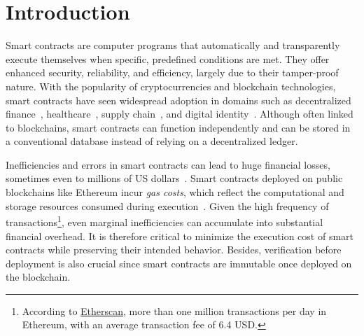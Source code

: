 \section{Introduction}

Smart contracts are computer programs that automatically and transparently execute themselves when specific, predefined conditions are met.
They offer enhanced security, reliability, and efficiency, largely due to their tamper-proof nature.
With the popularity of cryptocurrencies and blockchain technologies, smart contracts have seen widespread adoption in domains such as decentralized finance~\cite{schar2021decentralized}, healthcare~\cite{khatoon2020blockchain}, supply chain~\cite{queiroz2020blockchain}, and digital identity~\cite{takemiya2018sora}. Although often linked to blockchains, smart contracts can function independently and can be stored in a conventional database instead of relying on a decentralized ledger.

Inefficiencies and errors in smart contracts can lead to huge financial losses, sometimes even to millions of US dollars~\cite{zhang2020Framework}. Smart contracts deployed on public blockchains like Ethereum incur \emph{gas costs}, which reflect the computational and storage resources consumed during execution~\cite{wood2014ethereum}. Given the high frequency of transactions\footnote{ According to \href{https://etherscan.io/}{Etherscan}, more than one million transactions per day in Ethereum, with an average transaction fee of 6.4 USD.}, even marginal inefficiencies can accumulate into substantial financial overhead. It is therefore critical to minimize the execution cost of smart contracts while preserving their intended behavior. Besides, verification before deployment is also crucial since smart contracts are immutable once deployed on the blockchain.

